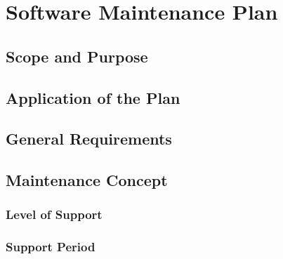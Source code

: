 \chapter{Software Maintenance Plan}


\section{Scope and Purpose}

\section{Application of the Plan}

\section{General Requirements}

\section{Maintenance Concept}

\subsection{Level of Support}

\subsection{Support Period}

